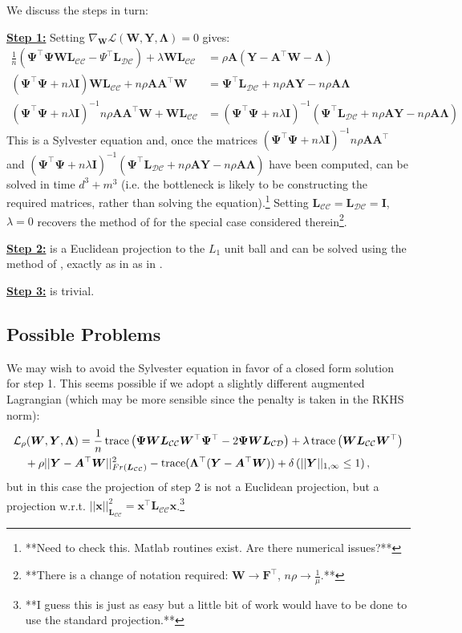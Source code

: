 \documentclass[letterpaper]{article}
\newcommand{\CsabaFLAM}{DBLP:conf/adprl/YaoSPZ14}
\newcommand{\DuchiProjections}{DBLP:conf/icml/DuchiSSC08}
\newcommand{\cD}{{\mathcal D}}
\newcommand{\cC}{{\mathcal C}}
\newcommand{\cL}{{\mathcal L}}
\newcommand{\bLambda}{{\bm \Lambda}}
\newcommand{\bL}{{\bm L}}
\newcommand{\bW}{{\bm W}}
\newcommand{\bA}{{\bm A}}
\newcommand{\bI}{{\bm I}}
\newcommand{\bY}{{\bm Y}}
\newcommand{\bx}{{\bm x}}
\newcommand{\bF}{{\bm F}}
\newcommand{\bPsi}{{\bm \Psi}}
\newcommand{\trace}{\operatornamewithlimits{trace}}
\newcommand{\nn}{\nonumber}
\begin{document}
We discuss the steps in turn:

\underline{\bf Step 1:} Setting $\nabla_{\bW} \cL(\bW,\bY,\bLambda) = 0$ gives:
\begin{align}
 \frac{1}{n}(\bPsi^\top \bPsi \bW \bL_{\cC\cC} - \Psi^\top\bL_{\cD\cC}) + \lambda\bW\bL_{\cC\cC}  &= \rho\bA(\bY-\bA^\top\bW-\bLambda) \nn\\
(\bPsi^\top \bPsi + n\lambda\bI)\bW \bL_{\cC\cC} + n\rho \bA\bA^\top\bW &= \bPsi^\top\bL_{\cD\cC} + n\rho\bA\bY - n\rho\bA\bLambda\nn\\
(\bPsi^\top \bPsi + n\lambda\bI)^{-1}n\rho \bA\bA^\top \bW + \bW \bL_{\cC\cC} &= (\bPsi^\top \bPsi + n\lambda\bI)^{-1}(\bPsi^\top\bL_{\cD\cC} + n\rho\bA\bY - n\rho\bA\bLambda)
\end{align}
This is a Sylvester equation and, once the matrices $(\bPsi^\top \bPsi + n\lambda\bI)^{-1}n\rho \bA\bA^\top$ and $(\bPsi^\top \bPsi + n\lambda\bI)^{-1}(\bPsi^\top\bL_{\cD\cC} + n\rho\bA\bY - n\rho\bA\bLambda)$ have been computed, can be solved in time $d^3+m^3$ (i.e. the bottleneck is likely to be constructing the required matrices, rather than solving the equation).\footnote{**Need to check this. Matlab routines exist. Are there numerical issues?**} Setting $\bL_{\cC\cC} = \bL_{\cD\cC} = \bI$, $\lambda= 0$ recovers the method of \cite{\CsabaFLAM} for the special case considered therein\footnote{**There is a change of notation required: $\bW \rightarrow \bF^\top$, $n\rho \rightarrow \frac{1}{\mu}$.**}.

\underline{\bf Step 2:} is a Euclidean projection to the $L_1$ unit ball and can be solved using the method of \cite{\DuchiProjections}, exactly as in as in \cite{\CsabaFLAM}.

\underline{\bf Step 3:} is trivial.

\subsection{Possible Problems}

We may wish to avoid the Sylvester equation in favor of a closed form solution for step 1. This seems possible if we adopt a slightly different augmented Lagrangian (which may be more sensible since the penalty is taken in the RKHS norm):
\begin{align}
&\cL_\rho(\bW,\bY,\bLambda) = \frac{1}{n} \trace\left( \bPsi \bW \bL_{\cC\cC} \bW^\top \bPsi^\top - 2\bPsi\bW\bL_{\cC\cD}  \right)  + \lambda   \trace\left(\bW \bL_{\cC\cC} \bW^\top\right)\nn\\
&\quad + \rho||\bY-\bA^\top\bW||^2_{Fr(\bL_{\cC\cC})} - \trace(\bLambda^\top(\bY - \bA^\top\bW))+ \delta\left( ||\bY||_{1,\infty} \le 1 \right) , \label{AugmentedLagrangian2}
\end{align}
but in this case the projection of step 2 is not a Euclidean projection, but a projection w.r.t. $||\bx||^2_{\bL_{\cC\cC}} = \bx^\top\bL_{\cC\cC} \bx$.\footnote{**I guess this is just as easy but a little bit of work would have to be done to use the standard projection.**}
\end{document}
